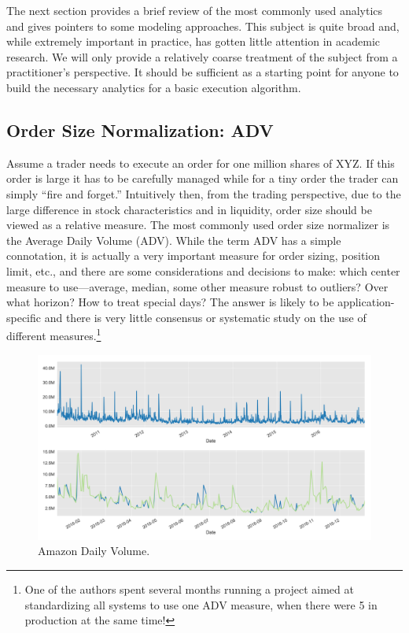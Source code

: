 The next section provides a brief review of the most commonly used analytics and gives pointers to some modeling approaches. This subject is quite broad and, while extremely important in practice, has gotten little attention in academic research. We will only provide a relatively coarse treatment of the subject from a practitioner's perspective. It should be sufficient as a starting point for anyone to build  the necessary analytics for a basic execution algorithm. 



\subsection{Order Size Normalization: ADV}

Assume a trader needs to execute an order for one million shares of XYZ. If this order is large it has to be carefully managed while for a tiny order the trader can simply ``fire and forget.''  Intuitively then, from the trading perspective, due to  the large difference in stock characteristics and in liquidity, order size should be viewed as a relative measure. The most commonly used order size normalizer is the Average Daily Volume (ADV). While the term ADV has a simple connotation, it is actually a very important measure for order sizing, position limit, etc., and there are some considerations and decisions to make: which center measure to use---average, median, some other measure robust to outliers? Over what horizon? How to treat special days? The answer is likely to be application-specific and there is very little consensus or systematic study on the use of different measures.\footnote{One of the authors spent several months running a project aimed at standardizing all systems to use one ADV measure, when there were 5 in production at the same time!}
 	
	\begin{figure}[!ht]
	\centering
	\includegraphics[width=\textwidth]{chapters/chapter_trade_data_models/figures/daily_volume.png} 
	\caption{Amazon Daily Volume. \label{fig:daily_volume}}
	\end{figure}


